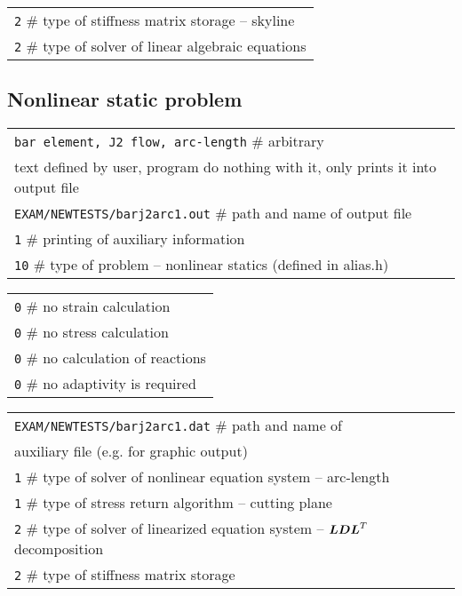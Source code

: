 \vspace{2mm}
\noindent
\begin{tabular}{l}
{\tt 2} $\#$ type of stiffness matrix storage -- skyline
\\
{\tt 2} $\#$ type of solver of linear algebraic equations
\end{tabular}

\subsection{Nonlinear static problem}

\noindent
\begin{tabular}{l}
{\tt bar element, J2 flow, arc-length} $\#$ arbitrary
\\
text defined by user, program do nothing with it, only
prints it into output file
\\
{\tt EXAM/NEWTESTS/barj2arc1.out} $\#$ path and name of output file
\\
{\tt 1} $\#$ printing of auxiliary information
\\
{\tt 10} $\#$ type of problem -- nonlinear statics (defined in alias.h)
\\
\end{tabular}

\vspace{2mm}
\noindent
\begin{tabular}{l}
{\tt 0} $\#$ no strain calculation
\\
{\tt 0} $\#$ no stress calculation
\\
{\tt 0} $\#$ no calculation of reactions
\\
{\tt 0} $\#$ no adaptivity is required
\\
\end{tabular}

\vspace{2mm}
\noindent
\begin{tabular}{l}
{\tt EXAM/NEWTESTS/barj2arc1.dat} $\#$ path and name of
\\ auxiliary file (e.g. for graphic output)
\\
{\tt 1} $\#$ type of solver of nonlinear equation system -- arc-length
\\
{\tt 1} $\#$ type of stress return algorithm -- cutting plane
\\
{\tt 2} $\#$ type of solver of linearized equation system -- $\mbox{\boldmath$LDL$}^T$ decomposition
\\
{\tt 2} $\#$ type of stiffness matrix storage
\\
\end{tabular}

